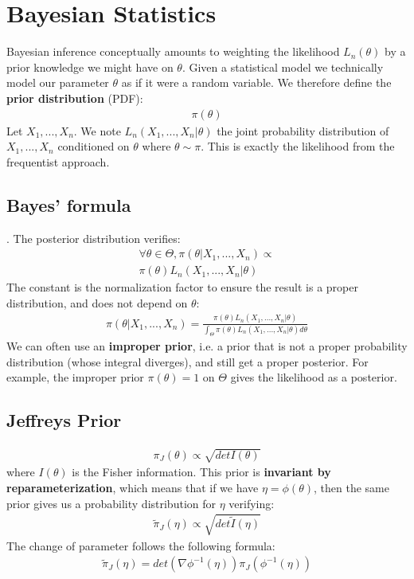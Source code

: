 \section{Bayesian Statistics}
Bayesian inference conceptually amounts to weighting the likelihood $L_n(\theta)$ by a prior knowledge we might have on $\theta$.
Given a statistical model we technically model our parameter $\theta$ as if it were a random variable. We therefore define the \textbf{prior distribution} (PDF):
\begin{align*}
\pi(\theta)
\end{align*}
Let $X_1,...,X_n$. We note $L_n(X_1,...,X_n|\theta)$ the joint probability distribution of $X_1,...,X_n$ conditioned on $\theta$ where $\theta \sim \pi$. This is exactly the likelihood from the frequentist approach.
\subsection{Bayes' formula}. 
The {posterior distribution} verifies:
\begin{align*}
\forall \theta \in \Theta, \pi(\theta|X_1,...,X_n) \propto\\ \pi(\theta)L_n(X_1,...,X_n | \theta)
\end{align*}
The constant is the normalization factor to ensure the result is a proper distribution, and does not depend on $\theta$:
\begin{align*}
\pi(\theta|X_1,...,X_n) = \frac{\pi(\theta)L_n(X_1,...,X_n | \theta)}{\int_\Theta\pi(\theta)L_n(X_1,...,X_n | \theta)d\theta}
\end{align*}
We can often use an \textbf{improper prior}, i.e. a prior that is not a proper probability distribution (whose integral diverges), and still get a proper posterior. For example, the improper prior $\pi(\theta) = 1$ on $\Theta$ gives the likelihood as a posterior.
\subsection{Jeffreys Prior}
\begin{align*}
\pi_J(\theta) \propto \sqrt{det I(\theta)}
\end{align*}
where $I(\theta)$ is the Fisher information. This prior is \textbf{invariant by reparameterization}, which means that if we have $\eta = \phi(\theta)$, then the same prior gives us a probability distribution for $\eta$ verifying:
\begin{align*}
\tilde\pi_J(\eta) \propto \sqrt{det \tilde I(\eta)}
\end{align*}
The change of parameter follows the following formula:
\begin{align*}
\tilde\pi_J(\eta) = det(\nabla \phi^{-1}(\eta)) \pi_J(\phi^{-1}(\eta))
\end{align*}
